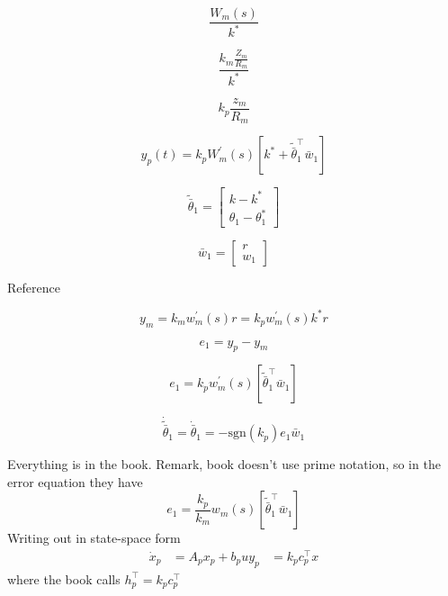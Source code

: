 \begin{equation*}
  \frac{W_{m}(s)}{k^{*}}
\end{equation*}

\begin{equation*}
  \frac{k_{m}\frac{Z_{m}}{R_{m}}}{k^{*}}
\end{equation*}

\begin{equation*}
  k_{p}\frac{z_{m}}{R_{m}}
\end{equation*}

\begin{equation*}
  y_{p}(t)=k_{p}W_{m}^{\prime}(s)[k^{*}+\tilde{\bar{\theta}}_{1}^{\top}\bar{w}_{1}]
\end{equation*}

\begin{equation*}
  \tilde{\bar{\theta}}_{1}=
  \begin{bmatrix}
    k-k^{*} \\
    \theta_{1}-\theta_{1}^{*}
  \end{bmatrix}
\end{equation*}

\begin{equation*}
  \bar{w}_{1}=
  \begin{bmatrix}
    r \\
    w_{1}
  \end{bmatrix}
\end{equation*}

Reference

\begin{equation*}
  y_{m}=k_{m}w_{m}^{\prime}(s)r=k_{p}w_{m}^{\prime}(s)k^{*}r
\end{equation*}

\begin{equation*}
  e_{1}=y_{p}-y_{m}
\end{equation*}

\begin{equation*}
  e_{1}=k_{p}w_{m}^{\prime}(s)[\tilde{\bar{\theta}}_{1}^{\top}\bar{w}_{1}]
\end{equation*}

\begin{equation*}
  \dot{\tilde{\bar{\theta}}}_{1}=\dot{\bar{\theta}}_{1}=-\text{sgn}(k_{p})e_{1}\bar{w}_{1}
\end{equation*}

Everything is in the book.
Remark, book doesn't use prime notation, so in the error equation they have
\begin{equation*}
  e_{1}=\frac{k_{p}}{k_{m}}w_{m}(s)[\tilde{\bar{\theta}}_{1}^{\top} \bar{w}_{1}]
\end{equation*}
Writing out in state-space form
\begin{align*}
  \dot{x}_{p}&=A_{p}x_{p}+b_{p}u
  y_{p}&=k_{p}c_{p}^{\top}x
\end{align*}
where the book calls $h_{p}^{\top}=k_{p}c_{p}^{\top}$


